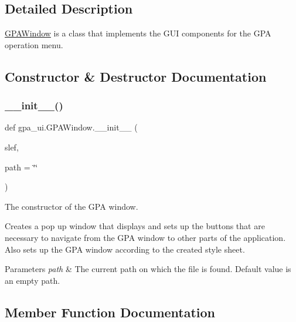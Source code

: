 \subsection{Detailed Description}
\hyperlink{classgpa__ui_1_1_g_p_a_window}{G\+P\+A\+Window} is a class that implements the G\+UI components for the G\+PA operation menu. 

\subsection{Constructor \& Destructor Documentation}
\mbox{\label{classgpa__ui_1_1_g_p_a_window_af341d6a11fb5030a5136cce247c95530}} 
\subsubsection{\texorpdfstring{\+\_\+\+\_\+init\+\_\+\+\_\+()}{\_\_init\_\_()}}
{\footnotesize\ttfamily def gpa\+\_\+ui.\+G\+P\+A\+Window.\+\_\+\+\_\+init\+\_\+\+\_\+ (\begin{DoxyParamCaption}\item[{}]{slef,  }\item[{}]{path = {\ttfamily \char`\"{}\char`\"{}} }\end{DoxyParamCaption})}



The constructor of the G\+PA window. 

Creates a pop up window that displays and sets up the buttons that are necessary to navigate from the G\+PA window to other parts of the application. Also sets up the G\+PA window according to the created style sheet. 
\begin{DoxyParams}{Parameters}
{\em path} & The current path on which the file is found. Default value is an empty path. \\
\hline
\end{DoxyParams}


\subsection{Member Function Documentation}
\mbox{\label{classgpa__ui_1_1_g_p_a_window_a36e992cfdee2fc99be76c95f6a342249}} 
